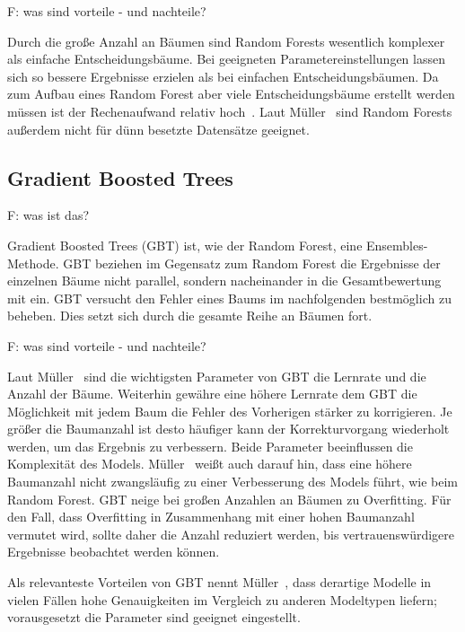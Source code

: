 F: was sind vorteile - und nachteile?

Durch die große Anzahl an Bäumen sind Random Forests wesentlich komplexer als einfache Entscheidungsbäume. Bei geeigneten Parametereinstellungen lassen sich so bessere Ergebnisse erzielen als bei einfachen Entscheidungsbäumen. Da zum Aufbau eines Random Forest aber viele Entscheidungsbäume erstellt werden müssen ist der Rechenaufwand relativ hoch~\cite[S.~84]{Muller.2017}. Laut Müller~\cite[S.~85]{Muller.2017} sind Random Forests außerdem nicht für dünn besetzte Datensätze geeignet.

\subsection{Gradient Boosted Trees}
\label{sec:gradient_boosted_trees}
F: was ist das?

Gradient Boosted Trees (GBT) ist, wie der Random Forest, eine Ensembles-Methode. GBT beziehen im Gegensatz zum Random Forest die Ergebnisse der einzelnen Bäume nicht parallel, sondern nacheinander in die Gesamtbewertung mit ein. GBT versucht den Fehler eines Baums im nachfolgenden bestmöglich zu beheben. Dies setzt sich durch die gesamte Reihe an Bäumen fort.

F: was sind vorteile - und nachteile?

Laut Müller~\cite{Muller.2017} sind die wichtigsten Parameter von GBT die Lernrate und die Anzahl der Bäume. Weiterhin gewähre eine höhere Lernrate dem GBT die Möglichkeit mit jedem Baum die Fehler des Vorherigen stärker zu korrigieren. Je größer die Baumanzahl ist desto häufiger kann der Korrekturvorgang wiederholt werden, um das Ergebnis zu verbessern. Beide Parameter beeinflussen die Komplexität des Models. Müller~\cite{Muller.2017} weißt auch darauf hin, dass eine höhere Baumanzahl nicht zwangsläufig zu einer Verbesserung des Models führt, wie beim Random Forest. GBT neige bei großen Anzahlen an Bäumen zu Overfitting. Für den Fall, dass Overfitting in Zusammenhang mit einer hohen Baumanzahl vermutet wird, sollte daher die Anzahl reduziert werden, bis vertrauenswürdigere Ergebnisse beobachtet werden können.

Als relevanteste Vorteilen von GBT nennt Müller~\cite{Muller.2017}, dass derartige Modelle in vielen Fällen hohe Genauigkeiten im Vergleich zu anderen Modeltypen liefern; vorausgesetzt die Parameter sind geeignet eingestellt.